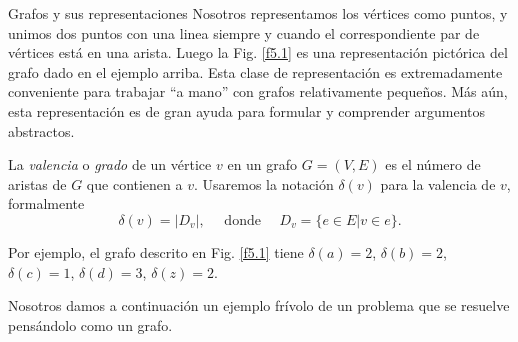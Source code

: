 \begin{section}{Grafos y sus representaciones}
Nosotros representamos los vértices como puntos, y unimos dos puntos con una linea siempre y cuando el correspondiente par de vértices está en una arista. Luego la Fig. \ref{f5.1} es una representación pictórica del grafo dado en el ejemplo arriba. Esta clase de representación es extremadamente conveniente para
trabajar ``a mano'' con grafos relativamente pequeños. Más aún, esta representación es de gran ayuda para formular y comprender argumentos abstractos. 

\begin{definicion}
    La \textit{{valencia}} o \textit{grado} de un vértice $v$ en un grafo $G=(V,E)$ es el  número de aristas de $G$ que contienen a $v$. Usaremos la notación $\delta(v)$ para la valencia de $v$, formalmente
$$
\delta(v)=|D_v|, \quad \text{ donde } \quad D_v=\{e \in E| v\in
e\}.
$$
\end{definicion}

Por ejemplo, el grafo descrito en Fig. \ref{f5.1} tiene $\delta(a)=2$, $\delta(b)=2$, $\delta(c)=1$, $\delta(d)=3$, $\delta(z)=2$.



Nosotros damos a continuación un ejemplo frívolo de un problema que se resuelve  pensándolo como un grafo.


\end{section}
